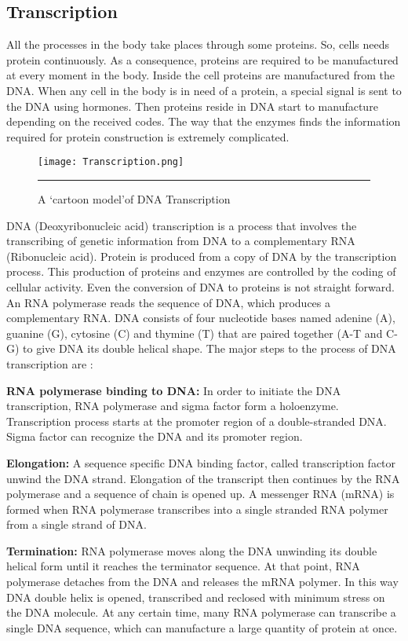 \subsection{Transcription}
All the processes in the body take places through some proteins. So, cells needs protein continuously. As a consequence, proteins are required to be manufactured at every moment in the body. Inside the cell proteins are manufactured from the DNA. When any cell in the body is in need of a protein, a special signal is sent to the DNA using hormones. Then proteins reside in DNA start to manufacture depending on the received codes. The way that the enzymes finds the information required for protein construction is extremely complicated.

\begin{figure}%
	\centering
		 \texttt{[image: Transcription.png]} 
		\rule{35em}{0.5pt}
	\caption{A \lq cartoon model\rq of DNA Transcription}
	\label{fig:transcription}
\end{figure}

DNA (Deoxyribonucleic acid) transcription is a process that involves the transcribing of genetic information from DNA to a complementary RNA (Ribonucleic acid). Protein is produced from a copy of DNA by the transcription process. This production of proteins and enzymes are controlled by the coding of cellular activity. Even the conversion of DNA to proteins is not straight forward. An RNA polymerase reads the sequence of DNA, which produces a complementary RNA. DNA consists of four nucleotide bases named adenine (A), guanine (G), cytosine (C) and thymine (T) that are paired together (A-T and C-G) to give DNA its double helical shape. The major steps to the process of DNA transcription are :

\textbf{RNA polymerase binding to DNA:} In order to initiate the DNA transcription, RNA polymerase and sigma factor form a holoenzyme. Transcription process starts at the promoter region of a double-stranded DNA. Sigma factor can recognize the DNA and its promoter region. 

\textbf{Elongation:} A sequence specific DNA binding factor, called transcription factor unwind the DNA strand. Elongation of the transcript then continues by the RNA polymerase and a sequence of chain is opened up. A messenger RNA (mRNA) is formed when RNA polymerase transcribes into a single stranded RNA polymer from a single strand of DNA.

\textbf{Termination:} RNA polymerase moves along the DNA unwinding its double helical form until it reaches the terminator sequence. At that point, RNA polymerase detaches from the DNA and releases the mRNA polymer. In this way DNA double helix is opened, transcribed and reclosed with minimum stress on the DNA molecule. At any certain time, many RNA polymerase can transcribe a single DNA sequence, which can manufacture a large quantity of protein at once. 

